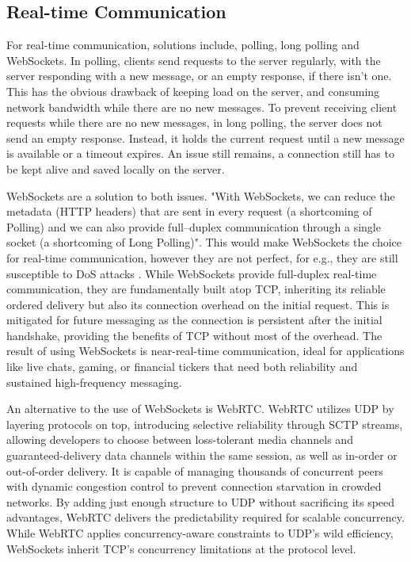 \documentclass[]{final}
\begin{document}
\subsection{Real-time Communication}

For real-time communication, solutions include, polling, long polling and WebSockets. In polling,
clients send requests to the server regularly, with the server responding with a new message, or
an empty response, if there isn't one. This has the obvious drawback of keeping load on the server,
and consuming network bandwidth while there are no new messages. To prevent receiving client requests
while there are no new messages, in long polling, the server does not send an empty response. Instead,
it holds the current request until a new message is available or a timeout expires. An issue still remains,
a connection still has to be kept alive and saved locally on the server.

WebSockets are a solution to both issues. "With WebSockets, we can reduce the metadata (HTTP headers) that are sent in
every request (a shortcoming of Polling) and we can also provide full–duplex communication through a
single socket (a shortcoming of Long Polling)". This would make WebSockets the choice for real-time
communication, however they are not perfect, for e.g., they are still susceptible to DoS attacks
\cite{gupta_overview_2018}. While WebSockets provide full-duplex real-time communication, they are
fundamentally built atop TCP, inheriting its reliable ordered delivery but
also its connection overhead on the initial request. This is mitigated for
future messaging as the connection is persistent after the initial
handshake, providing the benefits of TCP without most of the overhead.
The result of using WebSockets is near-real-time communication, ideal for
applications like live chats, gaming, or financial tickers that need both
reliability and sustained high-frequency messaging.

An alternative to the use of WebSockets is WebRTC. WebRTC utilizes UDP by
layering protocols on top, introducing selective reliability through SCTP
streams, allowing developers to choose between loss-tolerant media channels and
guaranteed-delivery data channels within the same session, as well as
in-order or out-of-order delivery. It is capable of
managing thousands of concurrent peers with dynamic congestion control to
prevent connection starvation in crowded networks. By
adding just enough structure to UDP without sacrificing its speed advantages,
WebRTC delivers the predictability required for scalable concurrency.
While WebRTC applies concurrency-aware constraints to UDP's wild efficiency,
WebSockets inherit TCP's concurrency limitations at the protocol level.
\end{document}
